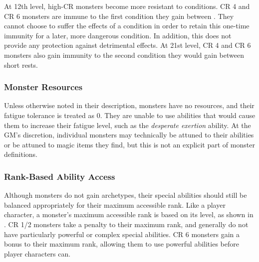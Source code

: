              At 12th level, high-CR monsters become more resistant to conditions.
            CR 4 and CR 6 monsters are immune to the first condition they gain between .
            They cannot choose to suffer the effects of a condition in order to retain this one-time immunity for a later, more dangerous condition.
            In addition, this does not provide any protection against detrimental  effects.
            At 21st level, CR 4 and CR 6 monsters also gain immunity to the second condition they would gain between short rests.

        \subsubsection{Monster Resources}
            Unless otherwise noted in their description, monsters have no resources, and their fatigue tolerance is treated as 0.
            They are unable to use abilities that would cause them to increase their fatigue level, such as the \textit{desperate exertion} ability.
            At the GM's discretion, individual monsters may technically be attuned to their abilities or be attuned to magic items they find, but this is not an explicit part of monster definitions.

        \subsubsection{Rank-Based Ability Access}\label{Rank-Based Ability Access}
            Although monsters do not gain archetypes, their special abilities should still be balanced appropriately for their maximum accessible rank.
            Like a player character, a monster's maximum accessible rank is based on its level, as shown in .
            CR 1/2 monsters take a  penalty to their maximum rank, and generally do not have particularly powerful or complex special abilities.
            CR 6 monsters gain a  bonus to their maximum rank, allowing them to use powerful abilities before player characters can.

